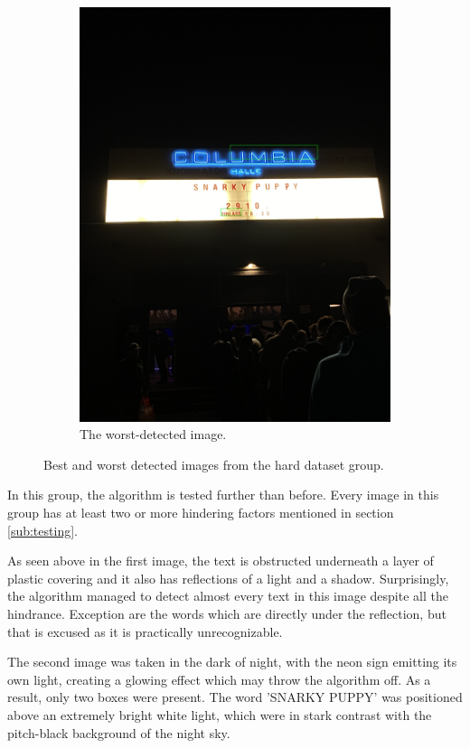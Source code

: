 \documentclass[10pt, a4paper]{article}
\begin{document}
\begin{figure}[h!]
\begin{subfigure}[b]{0.4\linewidth}
		\includegraphics[width=\linewidth]{jupyter/results/hard/sample_output_0.jpeg}
		\caption{The worst-detected image.}
	\end{subfigure}
	\caption{Best and worst detected images from the hard dataset group.}
	\label{fig:samplehardbestworst}
  \end{figure}

In this group, the algorithm is tested further than before. Every image in this group has at least two or more hindering factors mentioned in section \ref{sub:testing}. 

As seen above in the first image, the text is obstructed underneath a layer of plastic covering and it also has reflections of a light and a shadow. Surprisingly, the algorithm managed to detect almost every text in this image despite all the hindrance. Exception are the words which are directly under the reflection, but that is excused as it is practically unrecognizable.

The second image was taken in the dark of night, with the neon sign emitting its own light, creating a glowing effect which may throw the algorithm off. As a result, only two boxes were present. The word 'SNARKY PUPPY' was positioned above an extremely bright white light, which were in stark contrast with the pitch-black background of the night sky.
\end{document}
